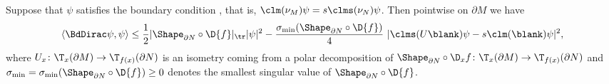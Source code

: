 \documentclass[a4paper,11pt]{amsart}
\numberwithin{equation}{section}
\begin{document}
\begin{lemma} \label{boundary_curvature_estimate}
    Suppose that \(\psi\) satisfies the boundary condition , that is, \(\clm(\nu_M) \psi = s \clms(\nu_N) \psi\).  
    Then pointwise on \(\partial M\) we have
    \begin{equation*}
        \langle \BdDirac \psi , \psi \rangle \leq \frac{1}{2} \lvert \Shape_{\partial N} \circ \D{f} \rvert_{\tr} \lvert \psi \rvert^2 - \frac{\sigma_{\min}(\Shape_{\partial N} \circ \D{f})}{4}\ \lvert \clms(U \blank) \psi - s \clm(\blank)\psi\rvert^2,
    \end{equation*}
    where \(U_x \colon \T_{x}(\partial M) \to \T_{f(x)}(\partial N)\) is an isometry coming from a polar decomposition of \(\Shape_{\partial N} \circ \D_x f \colon \T_{x}(\partial M) \to \T_{f(x)}(\partial N)\) and \(\sigma_{\min} = \sigma_{\min}(\Shape_{\partial N} \circ \D{f}) \geq 0\) denotes the smallest singular value of \(\Shape_{\partial N} \circ \D{f}\).
\end{lemma}
\end{document}
